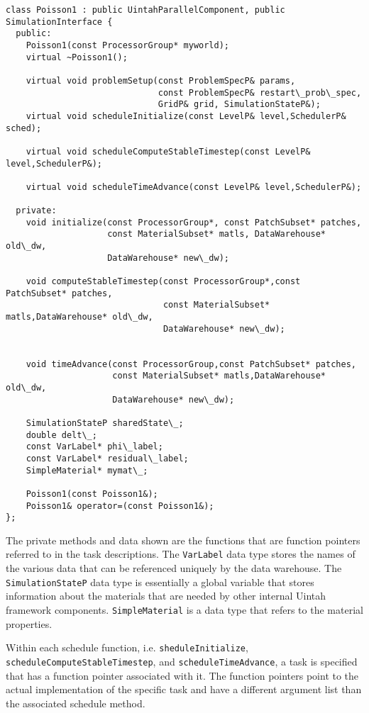\documentclass[12pt]{report}
\begin{document}
\begin{verbatim}
class Poisson1 : public UintahParallelComponent, public SimulationInterface {
  public:
    Poisson1(const ProcessorGroup* myworld);
    virtual ~Poisson1();

    virtual void problemSetup(const ProblemSpecP& params,
                              const ProblemSpecP& restart\_prob\_spec,
                              GridP& grid, SimulationStateP&);
    virtual void scheduleInitialize(const LevelP& level,SchedulerP& sched);

    virtual void scheduleComputeStableTimestep(const LevelP& level,SchedulerP&);

    virtual void scheduleTimeAdvance(const LevelP& level,SchedulerP&);

  private:
    void initialize(const ProcessorGroup*, const PatchSubset* patches,
                    const MaterialSubset* matls, DataWarehouse* old\_dw,
                    DataWarehouse* new\_dw);

    void computeStableTimestep(const ProcessorGroup*,const PatchSubset* patches,
                               const MaterialSubset* matls,DataWarehouse* old\_dw,
                               DataWarehouse* new\_dw);


    void timeAdvance(const ProcessorGroup,const PatchSubset* patches,
                     const MaterialSubset* matls,DataWarehouse* old\_dw,
                     DataWarehouse* new\_dw);

    SimulationStateP sharedState\_;
    double delt\_;
    const VarLabel* phi\_label;
    const VarLabel* residual\_label;
    SimpleMaterial* mymat\_;

    Poisson1(const Poisson1&);
    Poisson1& operator=(const Poisson1&);
};
\end{verbatim}

The private methods and data shown are the functions that are function
pointers referred to in the task descriptions.  The \texttt{VarLabel}
data type stores the names of the various data that can be referenced
uniquely by the data warehouse.  The \texttt{SimulationStateP} data
type is essentially a global variable that stores information about
the materials that are needed by other internal Uintah framework
components.  \texttt{SimpleMaterial} is a data type that refers to the
material properties.

Within each schedule function, i.e. \texttt{sheduleInitialize},
\texttt{scheduleComputeStableTimestep}, and
\texttt{scheduleTimeAdvance}, a task is specified that has a function
pointer associated with it.  The function pointers point to the actual
implementation of the specific task and have a different argument list
than the associated schedule method.
\end{document}
